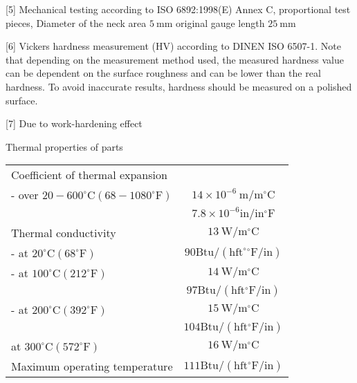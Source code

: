 \documentclass[10pt]{article}
\begin{document}
[5] Mechanical testing according to ISO 6892:1998(E) Annex C, proportional test pieces, Diameter of the neck area $5 \mathrm{~mm}$ original gauge length $25 \mathrm{~mm}$

[6] Vickers hardness measurement (HV) according to DINEN ISO 6507-1. Note that depending on the measurement method used, the measured hardness value can be dependent on the surface roughness and can be lower than the real hardness. To avoid inaccurate results, hardness should be measured on a polished surface.

[7] Due to work-hardening effect

Thermal properties of parts

\begin{center}
\begin{tabular}{lc}
\hline
Coefficient of thermal expansion &  \\
\cline { 2 - 2 }
- over $20-600^{\circ} \mathrm{C}\left(68-1080^{\circ} \mathrm{F}\right)$ & $14 \times 10^{-6} \mathrm{~m} / \mathrm{m}^{\circ} \mathrm{C}$ \\
 & $7.8 \times 10^{-6} \mathrm{in} / \mathrm{in}{ }^{\circ} \mathrm{F}$ \\
\hline
Thermal conductivity & $13 \mathrm{~W} / \mathrm{m}^{\circ} \mathrm{C}$ \\
- at $20^{\circ} \mathrm{C}\left(68^{\circ} \mathrm{F}\right)$ & $90 \mathrm{Btu} /\left(\mathrm{h} \mathrm{ft}^{\circ}{ }^{\circ} \mathrm{F} / \mathrm{in}\right)$ \\
\hline
- at $100^{\circ} \mathrm{C}\left(212^{\circ} \mathrm{F}\right)$ & $14 \mathrm{~W} / \mathrm{m}^{\circ} \mathrm{C}$ \\
 & $97 \mathrm{Btu} /\left(\mathrm{h} \mathrm{ft}{ }^{\circ} \mathrm{F} / \mathrm{in}\right)$ \\
- at $200^{\circ} \mathrm{C}\left(392^{\circ} \mathrm{F}\right)$ & $15 \mathrm{~W} / \mathrm{m}^{\circ} \mathrm{C}$ \\
 & $104 \mathrm{Btu} /\left(\mathrm{h} \mathrm{ft}{ }^{\circ} \mathrm{F} / \mathrm{in}\right)$ \\
\hline
at $300^{\circ} \mathrm{C}\left(572^{\circ} \mathrm{F}\right)$ & $16 \mathrm{~W} / \mathrm{m}^{\circ} \mathrm{C}$ \\
\hline
Maximum operating temperature & $111 \mathrm{Btu} /\left(\mathrm{h} \mathrm{ft}{ }^{\circ} \mathrm{F} / \mathrm{in}\right)$ \\
\hline
\end{tabular}
\end{center}
\end{document}
